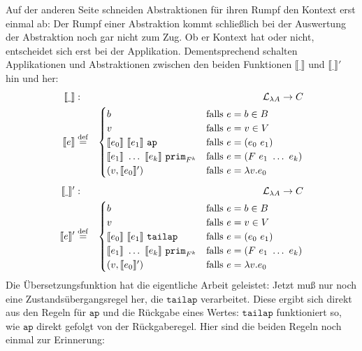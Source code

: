 Auf der anderen Seite schneiden Abstraktionen für ihren Rumpf den
Kontext erst einmal ab: Der Rumpf einer Abstraktion kommt schließlich bei der
Auswertung der Abstraktion noch gar nicht zum Zug.  Ob er Kontext hat
oder nicht, entscheidet sich erst bei der Applikation.
Dementsprechend schalten Applikationen und Abstraktionen zwischen den
beiden Funktionen $\llbracket \underline{~} \rrbracket$ und
$\llbracket \underline{~} \rrbracket'$ hin und her:
%
\begin{eqnarray*}
  \llbracket \underline{~} \rrbracket &:& \mathcal{L}_{\lambda{}A} \rightarrow C\\
  \llbracket e \rrbracket &\stackrel{\rm def}{=}&
  \begin{cases}
    b & \textrm{falls $e = b \in B$}\\
    v & \textrm{falls $e = v \in V$}\\
    \llbracket e_0\rrbracket~\llbracket e_1\rrbracket~\mathtt{ap}
    & \textrm{falls $e = (e_0~e_1)$}\\
    \llbracket e_1\rrbracket~\ldots~\llbracket e_k\rrbracket~\mathtt{prim}_{F^k}
    & \textrm{falls $e = (F~e_1~\ldots~e_k)$}\\
    (v, \llbracket e_0\rrbracket') & \textrm{falls $e = \lambda v.e_0$}
  \end{cases}\\[1ex]
  \llbracket \underline{~} \rrbracket' &:& \mathcal{L}_{\lambda{}A} \rightarrow C\\
  \llbracket e \rrbracket' &\stackrel{\rm def}{=}&
  \begin{cases}
    b & \textrm{falls $e = b \in B$}\\
    v & \textrm{falls $e = v \in V$}\\
    \llbracket e_0\rrbracket~\llbracket e_1\rrbracket~\mathtt{tailap}
    & \textrm{falls $e = (e_0~e_1)$}\\
    \llbracket e_1\rrbracket~\ldots~\llbracket e_k\rrbracket~\mathtt{prim}_{F^k}
    & \textrm{falls $e = (F~e_1~\ldots~e_k)$}\\
    (v, \llbracket e_0\rrbracket') & \textrm{falls $e = \lambda v.e_0$}
  \end{cases}
\end{eqnarray*}
%
Die Übersetzungsfunktion hat die eigentliche Arbeit geleistet: Jetzt
muß nur noch eine Zustandsübergangsregel her, die $\mathtt{tailap}$
verarbeitet.  Diese ergibt sich direkt aus den Regeln für
$\mathtt{ap}$ und die Rückgabe eines Wertes:  $\mathtt{tailap}$
funktioniert so, wie $\mathtt{ap}$ direkt gefolgt von der
Rückgaberegel.  Hier sind die beiden Regeln noch einmal zur Erinnerung:
